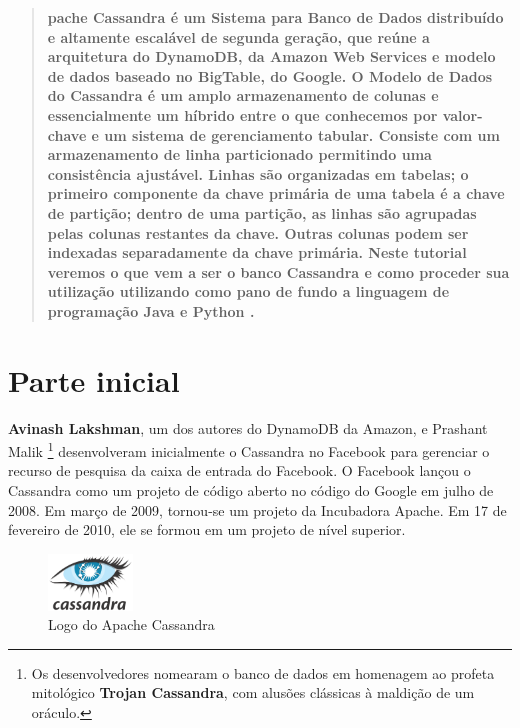 \documentclass[a4paper,11pt]{article}
\begin{document}
	
\maketitle %
\thispagestyle{fancy} %

	
\begin{abstract}
	\textbf{pache Cassandra é um Sistema para Banco de Dados distribuído e altamente escalável de segunda geração, que reúne a arquitetura do DynamoDB, da Amazon Web Services e modelo de dados baseado no BigTable, do Google. O Modelo de Dados do Cassandra é um amplo armazenamento de colunas e essencialmente um híbrido entre o que conhecemos por valor-chave e um sistema de gerenciamento tabular. Consiste com um armazenamento de linha particionado permitindo uma consistência ajustável. Linhas são organizadas em tabelas; o primeiro componente da chave primária de uma tabela é a chave de partição; dentro de uma partição, as linhas são agrupadas pelas colunas restantes da chave. Outras colunas podem ser indexadas separadamente da chave primária. Neste tutorial veremos o que vem a ser o banco Cassandra \cite{cassandraoficial} e como proceder sua utilização utilizando como pano de fundo a linguagem de programação Java \cite{javaoficial} e Python \cite{pythonoficial}.}
\end{abstract}


\section{Parte inicial}
\textbf{Avinash Lakshman}, um dos autores do DynamoDB da Amazon, e Prashant Malik \footnote{Os desenvolvedores nomearam o banco de dados em homenagem ao profeta mitológico \textbf{Trojan Cassandra}, com alusões clássicas à maldição de um oráculo.} desenvolveram inicialmente o Cassandra no Facebook para gerenciar o recurso de pesquisa da caixa de entrada do Facebook. O Facebook lançou o Cassandra como um projeto de código aberto no código do Google em julho de 2008.  Em março de 2009, tornou-se um projeto da Incubadora Apache. Em 17 de fevereiro de 2010, ele se formou em um projeto de nível superior.
\begin{figure}[H]
	\centering
	\includegraphics[width=0.2\textwidth]{imagens/logo}
	\caption{Logo do Apache Cassandra}
\end{figure}
\end{document}
